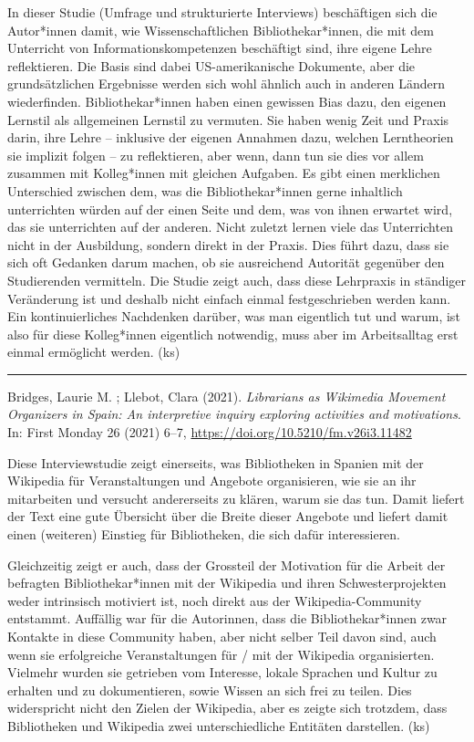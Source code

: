 \documentclass[a4paper,
fontsize=11pt,
oneside,
numbers=noperiodatend,
parskip=half-,
bibliography=totoc,
final
]{scrartcl}
\begin{document}
In dieser Studie (Umfrage und strukturierte Interviews) beschäftigen
sich die Autor*innen damit, wie Wissenschaftlichen Bibliothekar*innen,
die mit dem Unterricht von Informationskompetenzen beschäftigt sind,
ihre eigene Lehre reflektieren. Die Basis sind dabei US-amerikanische
Dokumente, aber die grundsätzlichen Ergebnisse werden sich wohl ähnlich
auch in anderen Ländern wiederfinden. Bibliothekar*innen haben einen
gewissen Bias dazu, den eigenen Lernstil als allgemeinen Lernstil zu
vermuten. Sie haben wenig Zeit und Praxis darin, ihre Lehre -- inklusive
der eigenen Annahmen dazu, welchen Lerntheorien sie implizit folgen --
zu reflektieren, aber wenn, dann tun sie dies vor allem zusammen mit
Kolleg*innen mit gleichen Aufgaben. Es gibt einen merklichen Unterschied
zwischen dem, was die Bibliothekar*innen gerne inhaltlich unterrichten
würden auf der einen Seite und dem, was von ihnen erwartet wird, das sie
unterrichten auf der anderen. Nicht zuletzt lernen viele das
Unterrichten nicht in der Ausbildung, sondern direkt in der Praxis. Dies
führt dazu, dass sie sich oft Gedanken darum machen, ob sie ausreichend
Autorität gegenüber den Studierenden vermitteln. Die Studie zeigt auch,
dass diese Lehrpraxis in ständiger Veränderung ist und deshalb nicht
einfach einmal festgeschrieben werden kann. Ein kontinuierliches
Nachdenken darüber, was man eigentlich tut und warum, ist also für diese
Kolleg*innen eigentlich notwendig, muss aber im Arbeitsalltag erst
einmal ermöglicht werden. (ks)

\begin{center}\rule{0.5\linewidth}{0.5pt}\end{center}

Bridges, Laurie M. ; Llebot, Clara (2021). \emph{Librarians as Wikimedia
Movement Organizers in Spain: An interpretive inquiry exploring
activities and motivations}. In: First Monday 26 (2021) 6--7,
\url{https://doi.org/10.5210/fm.v26i3.11482}

Diese Interviewstudie zeigt einerseits, was Bibliotheken in Spanien mit
der Wikipedia für Veranstaltungen und Angebote organisieren, wie sie an
ihr mitarbeiten und versucht andererseits zu klären, warum sie das tun.
Damit liefert der Text eine gute Übersicht über die Breite dieser
Angebote und liefert damit einen (weiteren) Einstieg für Bibliotheken,
die sich dafür interessieren.

Gleichzeitig zeigt er auch, dass der Grossteil der Motivation für die
Arbeit der befragten Bibliothekar*innen mit der Wikipedia und ihren
Schwesterprojekten weder intrinsisch motiviert ist, noch direkt aus der
Wikipedia-Community entstammt. Auffällig war für die Autorinnen, dass
die Bibliothekar*innen zwar Kontakte in diese Community haben, aber
nicht selber Teil davon sind, auch wenn sie erfolgreiche Veranstaltungen
für / mit der Wikipedia organisierten. Vielmehr wurden sie getrieben vom
Interesse, lokale Sprachen und Kultur zu erhalten und zu dokumentieren,
sowie Wissen an sich frei zu teilen. Dies widerspricht nicht den Zielen
der Wikipedia, aber es zeigte sich trotzdem, dass Bibliotheken und
Wikipedia zwei unterschiedliche Entitäten darstellen. (ks)
\end{document}
